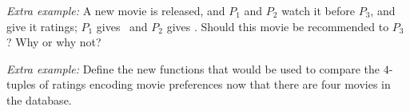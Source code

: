 \vfill

{\it Extra example:} A new movie is released, and $P_1$ and $P_2$ watch it before $P_3$, and give it
ratings; $P_1$ gives \cmark~and $P_2$ gives \xmark.
Should this movie be recommended to $P_3$? Why or why not?

{\it Extra example:} Define the new functions that would be used to compare the $4$-tuples of ratings encoding
movie preferences now that there are four movies in the database.
